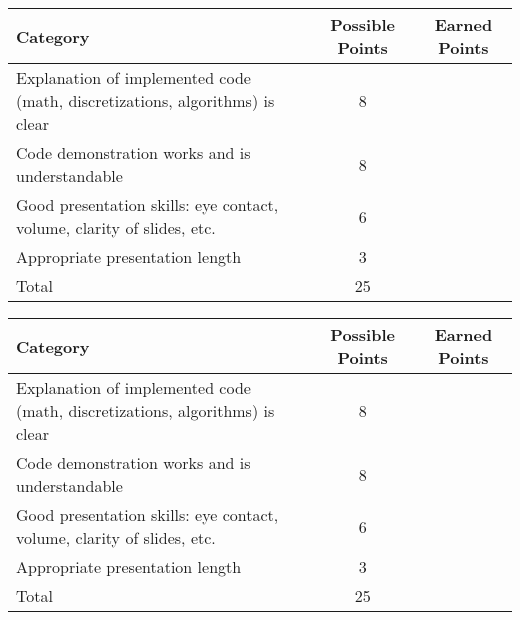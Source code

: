 \documentclass[a4paper, 12 pt]{curve}
\begin{document}
\renewcommand{\arraystretch}{2}

\begin{center}
\begin{tabu}{| X | c | c |}\hline
\textbf{Category} & \textbf{Possible Points} & \textbf{Earned Points} \\ \hline \hline
Explanation of implemented code (math, discretizations, algorithms) is clear & 8 & \\ \hline
Code demonstration works and is understandable & 8 & \\ \hline
Good presentation skills: eye contact, volume, clarity of slides, etc. & 6 & \\ \hline
Appropriate presentation length & 3 & \\ \hline
Total & 25 & \\\hline
\end{tabu} 
\end{center}

\vspace{2em}
\begin{center}
\begin{tabu}{| X | c | c |}\hline
\textbf{Category} & \textbf{Possible Points} & \textbf{Earned Points} \\ \hline \hline
Explanation of implemented code (math, discretizations, algorithms) is clear & 8 & \\ \hline
Code demonstration works and is understandable & 8 & \\ \hline
Good presentation skills: eye contact, volume, clarity of slides, etc. & 6 & \\ \hline
Appropriate presentation length & 3 & \\ \hline
Total & 25 & \\\hline
\end{tabu} 
\end{center}
\end{document}
